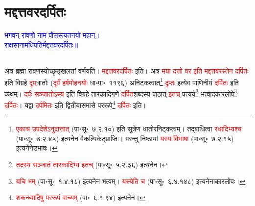 \section[मद्दत्तवरदर्पितः]{मद्दत्तवरदर्पितः}
\centering\textcolor{blue}{भगवन् रावणो नाम पौलस्त्यतनयो महान्।\nopagebreak\\
राक्षसानामधिपतिर्मद्दत्तवरदर्पितः॥}\nopagebreak\\
\\
\begin{sloppypar}\justifying\noindent\hspace{10mm} अत्र ब्रह्मा रावणस्योच्छृङ्खलतां वर्णयति। \textcolor{red}{मद्दत्तवर\-दर्पितः} इति। अत्र \textcolor{red}{मया दत्तो वर इति मद्दत्तवरस्तेन दर्पितः} इति विग्रहे \textcolor{red}{दृप्‌}\-धातोः (\textcolor{red}{दृपँ हर्षमोहनयोः} धा॰पा॰~११९६) अनिट्कत्वात्\footnote{\textcolor{red}{एकाच उपदेशेऽनुदात्तात्‌} (पा॰सू॰~७.२.१०) इति सूत्रेण धातोरनिट्कत्वम्। तद्बाधित्वा \textcolor{red}{रधादिभ्यश्च} (पा॰सू॰~७.२.४५) इत्यनेन वैकल्पिकेट्प्राप्तिः। परन्तु निष्ठायां \textcolor{red}{यस्य विभाषा} (पा॰सू॰~७.२.१५) इत्यनेनेडभावः।} \textcolor{red}{दृप्तः} इत्येव पाणिनीयं \textcolor{red}{दर्पितः} इति कथम्। \textcolor{red}{दर्पः सञ्जातोऽस्य} इति विग्रहे तारकादिगणे \textcolor{red}{दर्पित}\-शब्दस्य पाठात् \textcolor{red}{इतच्} प्रत्यये\footnote{\textcolor{red}{तदस्य सञ्जातं तारकादिभ्य इतच्} (पा॰सू॰~५.२.३६) इत्यनेन।} भत्वादकार\-लोपे\footnote{\textcolor{red}{यचि भम्} (पा॰सू॰~१.४.१८) इत्यनेन भत्वम्। \textcolor{red}{यस्येति च} (पा॰सू॰~६.४.१४८) इत्यनेनाकार\-लोपः।} \textcolor{red}{दर्पितः}। यद्वा \textcolor{red}{दर्पमितः} इति द्वितीया\-समासे पर\-रूपे\footnote{\textcolor{red}{शकन्ध्वादिषु पररूपं वाच्यम्} (वा॰~६.१.९४) इत्यनेन।} \textcolor{red}{दर्पितः} इति।\end{sloppypar}
